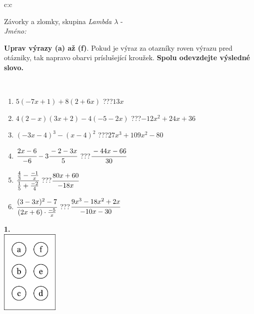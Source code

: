 \documentclass[10pt]{report}
\begin{document}
\begin{tabular}{c:c}
\begin{minipage}[c][104.5mm][t]{0.5\linewidth}
\begin{center}
\vspace{7mm}
{\huge Závorky a zlomky, skupina \textit{Lambda $\lambda$} -}\\[5mm]
\textit{Jméno:}\phantom{xxxxxxxxxxxxxxxxxxxxxxxxxxxxxxxxxxxxxxxxxxxxxxxxxxxxxxxxxxxxxxxxx}\\[5mm]
\begin{minipage}{0.95\linewidth}
\begin{center}
\textbf{Uprav výrazy (a) až (f)}. Pokud je výraz za otazníky roven výrazu pred otázniky, tak napravo obarvi príslušející kroužek. \textbf{Spolu odevzdejte výsledné slovo.}
\end{center}
\end{minipage}
\\[1mm]
\begin{minipage}{0.79\linewidth}
\begin{center}
\begin{varwidth}{\linewidth}
\begin{enumerate}
\normalsize
\item $5(-7x+1)+8(2+6x)$\quad \dotfill\; ???\;\dotfill \quad $13x$
\item $4(2-x)(3x+2)-4(-5-2x)$\quad \dotfill\; ???\;\dotfill \quad $-12x^2+24x+36$
\item $(-3x-4)^3-(x-4)^2$\quad \dotfill\; ???\;\dotfill \quad $27x^3+109x^2-80$
\item $\cfrac{2x-6}{-6}-3\cfrac{-2-3x}{5}$\quad \dotfill\; ???\;\dotfill \quad $\cfrac{-44x-66}{30}$
\item $\cfrac{\frac{4}{3}-\frac{-1}{x}}{\frac{1}{5}+\frac{-2}{4}}$\quad \dotfill\; ???\;\dotfill \quad $\cfrac{80x+60}{-18x}$
\item $\cfrac{(3-3x)^2-7}{(2x+6)\cdot\frac{-5}{x}}$\quad \dotfill\; ???\;\dotfill \quad $\cfrac{9x^3-18x^2+2x}{-10x-30}$
\end{enumerate}
\end{varwidth}
\end{center}
\end{minipage}
\begin{minipage}{0.20\linewidth}
\begin{center}
{\Huge\bfseries 1.} \\[2mm]
\includegraphics[height=40mm]{../images/braille.png}

\end{center}
\end{minipage}
\end{center}
\end{minipage}
\end{tabular}
\end{document}
